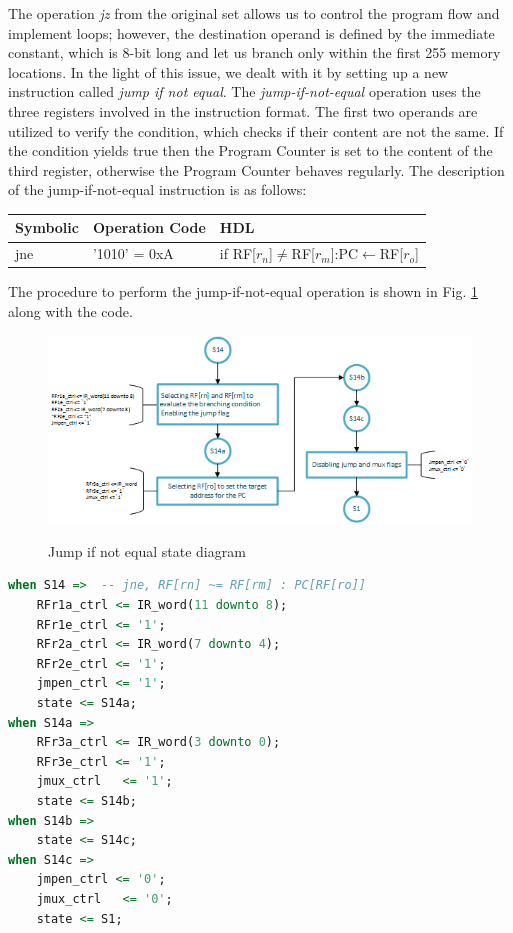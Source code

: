 \documentclass[]{article}
\begin{document}
The operation \textit{jz} from the original set allows us to control the program flow and implement loops; however, the destination operand is defined by the immediate constant, which is 8-bit long and let us branch only within the first 255 memory locations. In the light of this issue, we dealt with it by setting up a new instruction called \textit{jump if not equal}. The \textit{jump-if-not-equal} operation uses the three registers involved in the instruction format. The first two operands are utilized to verify the condition, which checks if their content are not the same. If the condition yields true then the Program Counter is set to the content of the third register, otherwise the Program Counter behaves regularly. The description of the jump-if-not-equal instruction is as follows:
\begin{table}[h]
	\centering
	{
		\begin{tabular}{|p{3cm}|p{3cm}|p{4.7cm}|}
			\hline
			\textbf{Symbolic} & \textbf{Operation Code} & \textbf{HDL} \\
			\hline
			jne & '1010' = 0xA & if RF[$r_n$]$\neq$RF[$r_m$]:PC$\leftarrow$RF[$r_o$]\\
			\hline
		\end{tabular}
	}
\end{table}

The procedure to perform the jump-if-not-equal operation is shown in Fig. \ref{fig:3} along with the code.
\begin{figure}[H]
	\caption{Jump if not equal state diagram}
	\centering
	\includegraphics[width=1\textwidth]{jne}
	\label{fig:3}
\end{figure}

\begin{lstlisting}[language=vhdl, caption={Jump if not equal state vhdl}, label={}]
when S14 =>  -- jne, RF[rn] ~= RF[rm] : PC[RF[ro]] 
	RFr1a_ctrl <= IR_word(11 downto 8);	
	RFr1e_ctrl <= '1'; 
	RFr2a_ctrl <= IR_word(7 downto 4);	
	RFr2e_ctrl <= '1'; 					
	jmpen_ctrl <= '1';
	state <= S14a;
when S14a =>   
	RFr3a_ctrl <= IR_word(3 downto 0);	
	RFr3e_ctrl <= '1'; 
	jmux_ctrl	<= '1';
	state <= S14b;
when S14b =>   
	state <= S14c;
when S14c =>   
	jmpen_ctrl <= '0';
	jmux_ctrl	<= '0';
	state <= S1;
\end{lstlisting}
\end{document}
